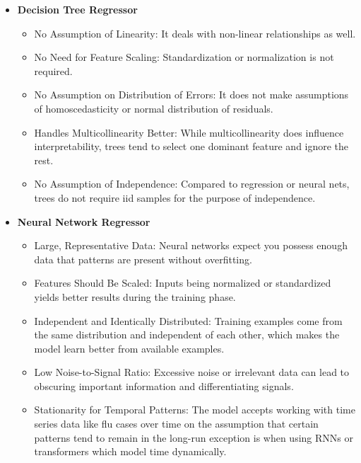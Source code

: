 \begin{itemize}
\begin{itemize}
\begin{itemize}
      \item Correct Model Specification: Assumes all relevant variables are present and exclusively irrelevant variables are excluded.
    \end{itemize}
    \item \textbf{Decision Tree Regressor}
    \begin{itemize}
      \item No Assumption of Linearity: It deals with non-linear relationships as well.
      \item No Need for Feature Scaling: Standardization or normalization is not required.
      \item No Assumption on Distribution of Errors: It does not make assumptions of homoscedasticity or normal distribution of residuals.
      \item Handles Multicollinearity Better: While multicollinearity does influence interpretability, trees tend to select one dominant feature and ignore the rest.
      \item No Assumption of Independence: Compared to regression or neural nets, trees do not require iid samples for the purpose of independence.
    \end{itemize}
    \item \textbf{Neural Network Regressor}
    \begin{itemize}
      \item Large, Representative Data: Neural networks expect you possess enough data that patterns are present without overfitting.
      \item Features Should Be Scaled: Inputs being normalized or standardized yields better results during the training phase.
      \item Independent and Identically Distributed: Training examples come from the same distribution and independent of each other, which makes the model learn better from available examples.
      \item Low Noise-to-Signal Ratio: Excessive noise or irrelevant data can lead to obscuring important information and differentiating signals.
      \item Stationarity for Temporal Patterns: The model accepts working with time series data like flu cases over time on the assumption that certain patterns tend to remain in the long-run exception is when using RNNs or transformers which model time dynamically.
    \end{itemize}
  \end{itemize}
\end{itemize}

